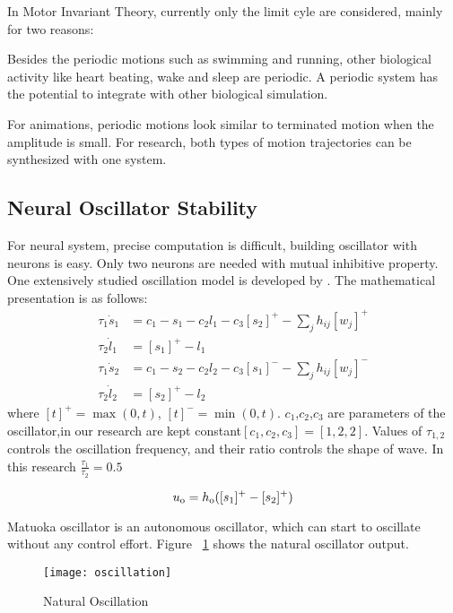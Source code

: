 In Motor Invariant Theory, currently only the limit cyle are considered, mainly for two reasons: 
\begin{itemize}
Besides the periodic motions such as swimming and running, other biological activity like heart beating, wake and sleep  are periodic.
A periodic system has the potential to integrate with other biological simulation.

For animations, periodic motions look similar to terminated motion when the amplitude is small. 
For \cms research, both types of motion trajectories can be synthesized with one system.
\end{itemize}

\subsection{Neural Oscillator Stability}
For neural system, precise computation is difficult,  building oscillator with neurons is easy. 
Only two neurons are needed with mutual inhibitive property.
One extensively studied oscillation model is developed by \citet{neurooscillation}. 
The mathematical presentation is as follows:
\begin{align}
\tau_{1} \dot{s}_{1}&=c_1-s_{1}-c_2 l_{1}-c_3 [s_{2}]^{+}-\sum_{j}h_{ij}[w_{j}]^{+} \nonumber\\
\tau_{2} \dot{l}_{1}&=[s_{1}]^{+}-l_{1} \nonumber\\
\tau_{1} \dot{s}_{2}&=c_1-s_{2}-c_2 l_{2}-c_3 [s_{1}]^{-}-\sum_{j}h_{ij}[w_{j}]^{-} \nonumber\\
\tau_{2} \dot{l}_{2}&=[s_{2}]^{+}-l_{2}\label{eq:matsuta}
\end{align}
where $[t]^{+}=\max(0,t)$, $[t]^{-}=\min(0,t)$.
$c_1$,$c_2$,$c_3$ are parameters of the oscillator,in our research are kept constant$[c_1,c_2,c_3]=[1,2,2]$.
Values of $\tau_{1,2}$ controls the oscillation frequency, and their ratio controls the shape of wave.
In this research $\frac{\tau_{1}}{\tau_{2}}=0.5$


\begin{equation}
u_{\mathrm{o}}=h_{\mathrm{o}}([s_{1}]^{+}-[s_{2}]^{+})
\end{equation}







Matuoka oscillator is an autonomous oscillator, which can start to oscillate without any control effort.
Figure ~\ref{fig:natural-oscilation} shows the natural oscillator output.
\begin{figure}[h]
\begin{center}
\texttt{[image: oscillation]}
\caption{Natural Oscillation}
\label{fig:natural-oscilation}
\end{center}
\end{figure}





